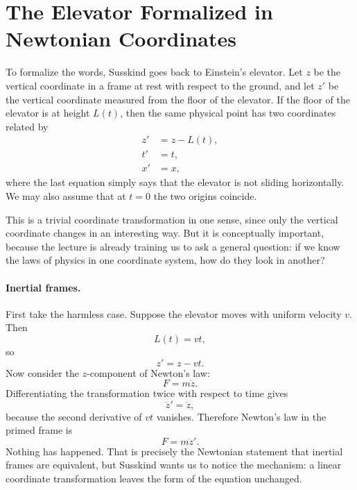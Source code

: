 \section{The Elevator Formalized in Newtonian Coordinates}

To formalize the words, Susskind goes back to Einstein's elevator.  Let \(z\) be the vertical coordinate in a frame at rest with respect to the ground, and let \(z'\) be the vertical coordinate measured from the floor of the elevator.  If the floor of the elevator is at height \(L(t)\), then the same physical point has two coordinates related by
\begin{align}
z' &= z - L(t), \\
t' &= t, \\
x' &= x,
\end{align}
where the last equation simply says that the elevator is not sliding horizontally.  We may also assume that at \(t=0\) the two origins coincide.

This is a trivial coordinate transformation in one sense, since only the vertical coordinate changes in an interesting way.  But it is conceptually important, because the lecture is already training us to ask a general question: if we know the laws of physics in one coordinate system, how do they look in another?

\paragraph{Inertial frames.}
First take the harmless case.  Suppose the elevator moves with uniform velocity \(v\).  Then
\begin{equation}
L(t)=vt,
\end{equation}
so
\begin{equation}
z' = z-vt.
\end{equation}
Now consider the \(z\)-component of Newton's law:
\begin{equation}
F = m\ddot z.
\end{equation}
Differentiating the transformation twice with respect to time gives
\begin{equation}
\ddot z'=\ddot z,
\end{equation}
because the second derivative of \(vt\) vanishes.  Therefore Newton's law in the primed frame is
\begin{equation}
F=m\ddot z'.
\end{equation}
Nothing has happened.  That is precisely the Newtonian statement that inertial frames are equivalent, but Susskind wants us to notice the mechanism: a linear coordinate transformation leaves the form of the equation unchanged.

